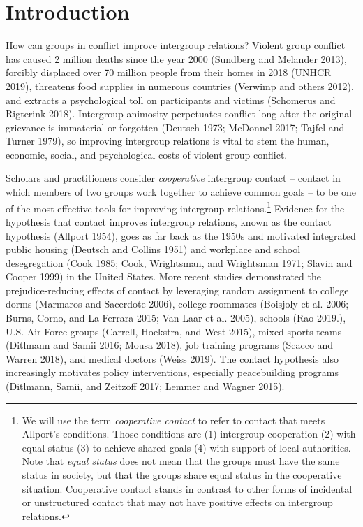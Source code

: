 \documentclass[11pt]{article}
\begin{document}
\hypertarget{introduction}{%
\section{Introduction}\label{introduction}}

How can groups in conflict improve intergroup relations? Violent group
conflict has caused 2 million deaths since the year 2000 (Sundberg and
Melander 2013), forcibly displaced over 70 million people from their
homes in 2018 (UNHCR 2019), threatens food supplies in numerous
countries (Verwimp and others 2012), and extracts a psychological toll
on participants and victims (Schomerus and Rigterink 2018). Intergroup
animosity perpetuates conflict long after the original grievance is
immaterial or forgotten (Deutsch 1973; McDonnel 2017; Tajfel and Turner
1979), so improving intergroup relations is vital to stem the human,
economic, social, and psychological costs of violent group conflict.

Scholars and practitioners consider \emph{cooperative} intergroup
contact -- contact in which members of two groups work together to
achieve common goals -- to be one of the most effective tools for
improving intergroup relations.\footnote{We will use the term
  \emph{cooperative contact} to refer to contact that meets Allport's
  conditions. Those conditions are (1) intergroup cooperation (2) with
  equal status (3) to achieve shared goals (4) with support of local
  authorities. Note that \emph{equal status} does not mean that the
  groups must have the same status in society, but that the groups share
  equal status in the cooperative situation. Cooperative contact stands
  in contrast to other forms of incidental or unstructured contact that
  may not have positive effects on intergroup relations.} Evidence for
the hypothesis that contact improves intergroup relations, known as the
contact hypothesis (Allport 1954), goes as far back as the 1950s and
motivated integrated public housing (Deutsch and Collins 1951) and
workplace and school desegregation (Cook 1985; Cook, Wrightsman, and
Wrightsman 1971; Slavin and Cooper 1999) in the United States. More
recent studies demonstrated the prejudice-reducing effects of contact by
leveraging random assignment to college dorms (Marmaros and Sacerdote
2006), college roommates (Boisjoly et al. 2006; Burns, Corno, and La
Ferrara 2015; Van Laar et al. 2005), schools (Rao 2019.), U.S. Air Force
groups (Carrell, Hoekstra, and West 2015), mixed sports teams (Ditlmann
and Samii 2016; Mousa 2018), job training programs (Scacco and Warren
2018), and medical doctors (Weiss 2019). The contact hypothesis also
increasingly motivates policy interventions, especially peacebuilding
programs (Ditlmann, Samii, and Zeitzoff 2017; Lemmer and Wagner 2015).
\end{document}
